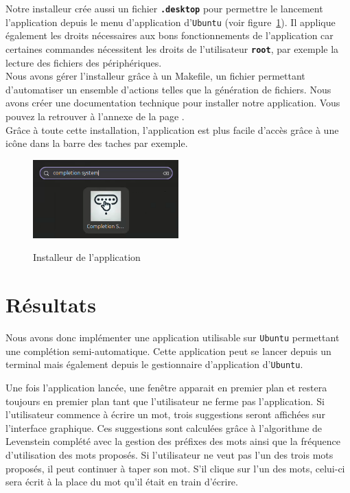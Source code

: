 \documentclass[a4paper, 11pt]{report}
\newcommand{\var}[1]{\texttt{\textbf{#1}}}
\newcommand{\langage}[1]{\texttt{#1}}
\begin{document}
{Notre installeur crée aussi un fichier \var{.desktop} pour permettre le lancement l'application depuis le menu d'application d'\langage{Ubuntu} (voir figure~\ref{fig:lanceur}). Il applique également les droits nécessaires aux bons fonctionnements de l'application car certaines commandes nécessitent les droits de l'utilisateur \var{root}, par exemple la lecture des fichiers des périphériques. \\

Nous avons gérer l'installeur grâce à un Makefile, un fichier permettant d'automatiser un ensemble d'actions telles que la génération de fichiers. Nous avons créer une documentation technique pour installer notre application. Vous pouvez la retrouver à l'annexe de la page \underline{\pageref{annexe}}.\\

Grâce à toute cette installation, l'application est plus facile d'accès grâce à une icône dans la barre des taches par exemple.

\begin{figure}[H]
	\begin{center}
		{\includegraphics[width=0.5\textwidth]{images/application.png}}
	\end{center}
	\caption{Installeur de l'application}
	\label{fig:lanceur}
\end{figure}

\section{Résultats}
Nous avons donc implémenter une application utilisable sur \langage{Ubuntu} permettant une complétion semi-automatique. Cette application peut se lancer depuis un terminal mais également depuis le gestionnaire d'application d'\langage{Ubuntu}. \par
Une fois l'application lancée, une fenêtre apparait en premier plan et restera toujours en premier plan tant que l'utilisateur ne ferme pas l'application. Si l'utilisateur commence à écrire un mot, trois suggestions seront affichées sur l'interface graphique. Ces suggestions sont calculées grâce à l'algorithme de Levenstein complété avec la gestion des préfixes des mots ainsi que la fréquence d'utilisation des mots proposés. Si l'utilisateur ne veut pas l'un des trois mots proposés, il peut continuer à taper son mot. S'il clique sur l'un des mots, celui-ci sera écrit à la place du mot qu'il était en train d'écrire.


}
\end{document}
